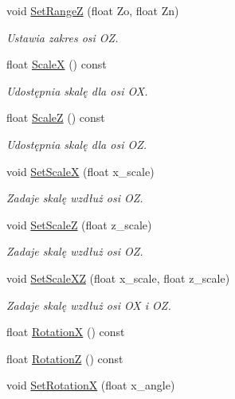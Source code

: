 \begin{DoxyCompactItemize}
void \hyperlink{class_pz_g_1_1_gnuplot_link_a6cb4123fb2cbe459a747c2a1c1f94770}{Set\+RangeZ} (float Zo, float Zn)
\begin{DoxyCompactList}\small\item\em Ustawia zakres osi {\itshape OZ}. \end{DoxyCompactList}\item 
float \hyperlink{class_pz_g_1_1_gnuplot_link_a1ffc96315a688f5ed0cd9d772ae1a1df}{ScaleX} () const
\begin{DoxyCompactList}\small\item\em Udostępnia skalę dla osi {\itshape OX}. \end{DoxyCompactList}\item 
float \hyperlink{class_pz_g_1_1_gnuplot_link_ac8f652a7f9a44568b00069e63ffdaa2e}{ScaleZ} () const
\begin{DoxyCompactList}\small\item\em Udostępnia skalę dla osi {\itshape OZ}. \end{DoxyCompactList}\item 
void \hyperlink{class_pz_g_1_1_gnuplot_link_a70d30fdb78dad112f96963a55f69e279}{Set\+ScaleX} (float x\+\_\+scale)
\begin{DoxyCompactList}\small\item\em Zadaje skalę wzdłuż osi {\itshape OZ}. \end{DoxyCompactList}\item 
void \hyperlink{class_pz_g_1_1_gnuplot_link_adb266ff0cb6bc916dcb12b6bd168ba14}{Set\+ScaleZ} (float z\+\_\+scale)
\begin{DoxyCompactList}\small\item\em Zadaje skalę wzdłuż osi {\itshape OZ}. \end{DoxyCompactList}\item 
void \hyperlink{class_pz_g_1_1_gnuplot_link_a922cef9903317477051890311f6f4dec}{Set\+Scale\+XZ} (float x\+\_\+scale, float z\+\_\+scale)
\begin{DoxyCompactList}\small\item\em Zadaje skalę wzdłuż osi {\itshape OX} i {\itshape OZ}. \end{DoxyCompactList}\item 
float \hyperlink{class_pz_g_1_1_gnuplot_link_a93c58deadc1c9bb9b85a5fa51d5d946a}{RotationX} () const
\item 
float \hyperlink{class_pz_g_1_1_gnuplot_link_aa734824e9997fb565da289791f03d149}{RotationZ} () const
\item 
void \hyperlink{class_pz_g_1_1_gnuplot_link_ace414a178fc745111344ce2390e363b7}{Set\+RotationX} (float x\+\_\+angle)

\end{DoxyCompactItemize}
